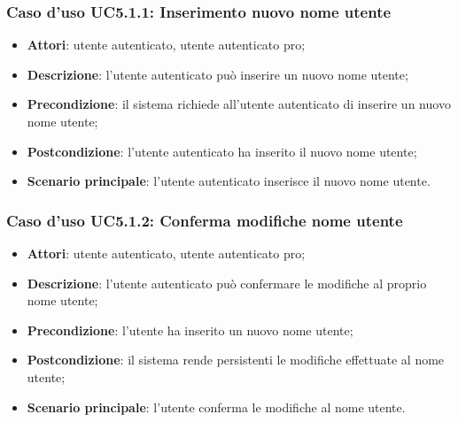 \subsubsection{Caso d'uso UC5.1.1: Inserimento nuovo nome utente}

\begin{itemize}
	\item \textbf{Attori}: utente autenticato, utente autenticato pro;
	\item \textbf{Descrizione}: l'utente autenticato può inserire un nuovo nome utente;
	\item \textbf{Precondizione}: il sistema richiede all'utente autenticato di inserire un nuovo nome utente;
	\item \textbf{Postcondizione}: l'utente autenticato ha inserito il nuovo nome utente;
	\item \textbf{Scenario principale}: l'utente autenticato inserisce il nuovo nome utente.
\end{itemize}

\subsubsection{Caso d'uso UC5.1.2: Conferma modifiche nome utente}

\begin{itemize}
	\item \textbf{Attori}: utente autenticato, utente autenticato pro;
	\item \textbf{Descrizione}: l'utente autenticato può confermare le modifiche al proprio nome utente;
	\item \textbf{Precondizione}: l'utente ha inserito un nuovo nome utente;
	\item \textbf{Postcondizione}: il sistema rende persistenti le modifiche effettuate al nome utente;
	\item \textbf{Scenario principale}: l'utente conferma le modifiche al nome utente.
\end{itemize}

